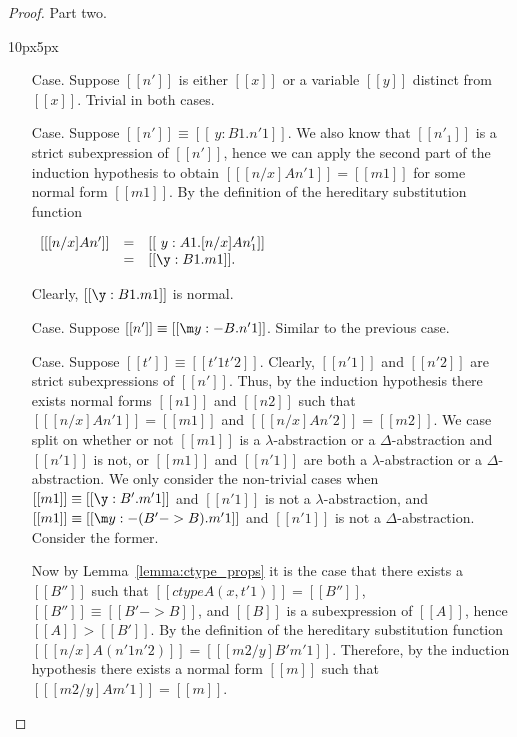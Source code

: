 \begin{proof}
  \noindent Part two.
  \vspace{-25px}
  \begin{changemargin}{10px}{5px}\noindent
  \begin{itemize}
  \item[Case.] Suppose $[[n']]$ is either $[[x]]$ or a variable $[[y]]$ distinct from $[[x]]$.  
    Trivial in both cases.

  \item[Case.] Suppose $[[n']] \equiv [[\ y:B1.n'1]]$.  
    We also know that $[[n'_1]]$ is a strict subexpression of $[[n']]$, hence we can apply the second part of the
    induction hypothesis to obtain
    $[[ [n/x] A n'1]] = [[m1]]$ for some normal form $[[m1]]$.  
    By the definition of the hereditary substitution function 
    \begin{center}
      \begin{math}
        \begin{array}{lll}
          [[ [n/x] A n']] & = & [[\ y:A1.[n/x] A n'_1]] \\
          & = & [[\y:B1.m1]].
        \end{array}
      \end{math}
    \end{center}
    Clearly, $[[\y:B1.m1]]$ is normal.
    
  \item[Case.] Suppose $[[n']] \equiv [[\m y:{-B}.n'1]]$.  Similar to the previous case.

  \item[Case.] Suppose $[[t']] \equiv [[t'1 t'2]]$.
    Clearly, $[[n'1]]$ and $[[n'2]]$ are strict subexpressions of $[[n']]$.  Thus, by the 
    induction hypothesis there exists normal forms $[[n1]]$ and $[[n2]]$ such that 
    $[[ [n/x] A n'1]] = [[m1]]$ and
    $[[ [n/x] A n'2]] = [[m2]]$.
    We case split on whether or not $[[m1]]$ is a $\lambda$-abstraction or
    a $\Delta$-abstraction and $[[n'1]]$ is not, or $[[m1]]$ and $[[n'1]]$ are both a 
    $\lambda$-abstraction or a $\Delta$-abstraction.  
    We only consider the non-trivial cases when $[[m1]] \equiv [[\y:B'.m'1]]$ and 
    $[[n'1]]$ is not a 
    $\lambda$-abstraction, and $[[m1]] \equiv [[\m y:{-(B'->B)}.m'1]]$ and $[[n'1]]$ is not a 
    $\Delta$-abstraction.  Consider the former.
   
    Now by Lemma~\ref{lemma:ctype_props} it is the case that 
    there exists a $[[B'']]$ such that $[[ctype A (x,t'1)]] = [[B'']]$, 
    $[[B'']] \equiv [[B' -> B]]$, and $[[B]]$ is a subexpression of $[[A]]$, hence
    $[[A]] > [[B']]$.  By the definition of the hereditary substitution function
    $[[ [n/x] A (n'1 n'2)]] = [[ [m2/y] B' m'1]]$. Therefore, by the induction hypothesis there 
    exists a 
    normal form $[[m]]$ such that $[[ [m2/y] A m'1]] = [[m]]$.
    

\end{itemize}
\end{changemargin}
\end{proof}
